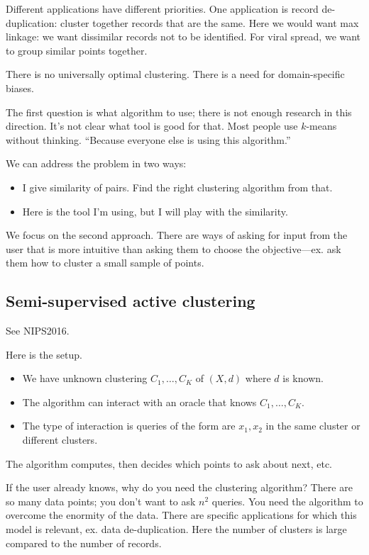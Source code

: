 Different applications have different priorities. One application is record de-duplication: cluster together records that are the same. Here we would want max linkage: we want dissimilar records not to be identified. For viral spread, we want to group similar points together.

There is no universally optimal clustering.
There is a need for domain-specific biases.

The first question is what algorithm to use; there is not enough research in this direction. 
It's not clear what tool is good for that.
Most people use $k$-means without thinking. ``Because everyone else is using this algorithm.''


We can address the problem %
in two ways: 
\begin{itemize}
\item
I give similarity of pairs. Find the right clustering algorithm from that.
\item
Here is the tool I'm using, but I will play with the similarity.
\end{itemize}
We focus on the second approach. 
There are ways of asking for input from the user that is more intuitive than asking them to choose the objective---ex. ask them how to cluster a small sample of points.

\subsection{Semi-supervised active clustering}

See NIPS2016.

Here is the setup.
\begin{itemize}
\item
We have unknown clustering $C_1,\ldots, C_K$ of $(X,d)$ where $d$ is known.
\item
The algorithm can interact with an oracle that knows $C_1,\ldots, C_K$.
\item
The type of interaction is queries of the form are $x_1,x_2$ in the same cluster or different clusters.
\end{itemize}
The algorithm computes, then decides which points to ask about next, etc.

If the user already knows, why do you need the clustering algorithm? There are so many data points; you don't want to ask $n^2$ queries. You need the algorithm to overcome the enormity of the data.
There are specific applications for which this model is relevant, ex. data de-duplication. Here the number of clusters is large compared to the number of records.

